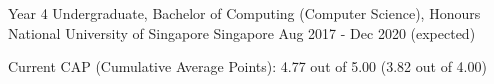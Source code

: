

\begin{cventries}

  \cventry
  {Year 4 Undergraduate, Bachelor of Computing (Computer Science), Honours} %
  {National University of Singapore} %
  {Singapore} %
  {Aug 2017 - Dec 2020 (expected)} %
  {
    \begin{cvitems} %
      \item {Current CAP (Cumulative Average Points): 4.77 out of 5.00 (3.82 out of 4.00)}
    \end{cvitems}
  }




\end{cventries}
